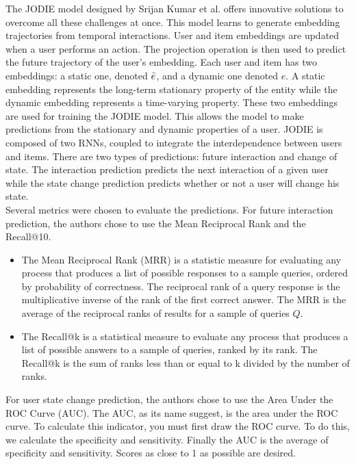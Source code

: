 The JODIE model designed by Srijan Kumar et al.\supercite{kumar2019predicting} offers innovative solutions to overcome all these challenges at once. This model learns to generate embedding trajectories from temporal interactions. User and item embeddings are updated when a user performs an action. The projection operation is then used to predict the future trajectory of the user's embedding. Each user and item has two embeddings: a static one, denoted $\Bar{e}$, and a dynamic one denoted $e$. A static embedding represents the long-term stationary property of the entity while the dynamic embedding represents a time-varying property. These two embeddings are used for training the JODIE model. This allows the model to make predictions from the stationary and dynamic properties of a user. JODIE is composed of two RNNs, coupled to integrate the interdependence between users and items. There are two types of predictions: future interaction and change of state. The interaction prediction predicts the next interaction of a given user while the state change prediction predicts whether or not a user will change his state.\\

Several metrics were chosen to evaluate the predictions. For future interaction prediction, the authors chose to use the Mean Reciprocal Rank and the Recall@10.
\begin{itemize}
    \item The Mean Reciprocal Rank (MRR) is a statistic measure for evaluating any process that produces a list of possible responses to a sample queries, ordered by probability of correctness. The reciprocal rank of a query response is the multiplicative inverse of the rank of the first correct answer. The MRR is the average of the reciprocal ranks of results for a sample of queries $Q$.
    \item The Recall@k is a statistical measure to evaluate any process that produces a list of possible answers to a sample of queries, ranked by its rank. The Recall@k is the sum of ranks less than or equal to k divided by the number of ranks.
\end{itemize}

For user state change prediction, the authors chose to use the Area Under the ROC Curve (AUC). The AUC, as its name suggest, is the area under the ROC curve. To calculate this indicator, you must first draw the ROC curve. To do this, we calculate the specificity and sensitivity. Finally the AUC is the average of specificity and sensitivity. Scores as close to 1 as possible are desired.

